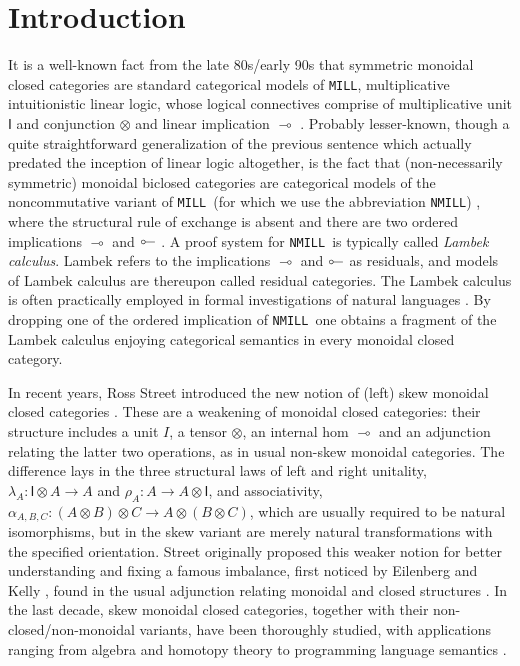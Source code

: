 \documentclass[submission,copyright,creativecommons]{eptcs}
\theoremstyle{definition}
\newcommand{\ot}{\otimes}
\newcommand{\lolli}{\multimap}
\newcommand{\illol}{\rotatebox[origin=c]{180}{$\multimap$}}
\newcommand{\I}{\mathsf{I}}
\newcommand{\MILL}{\texttt{MILL}}
\newcommand{\NMILL}{\texttt{NMILL}}
\begin{document}
\section{Introduction}
It is a well-known fact from the late 80s/early 90s that symmetric monoidal closed categories are standard categorical models of \MILL, multiplicative intuitionistic linear logic, whose logical connectives comprise of multiplicative unit $\I$ and conjunction $\ot$ and linear implication $\lolli$ \cite{mellies:categorical:09}. Probably lesser-known, though a quite straightforward generalization of the previous sentence which actually predated the inception of linear logic altogether, is the fact that (non-necessarily symmetric) monoidal biclosed categories are categorical models of the noncommutative variant of \MILL\ (for which we use the abbreviation \NMILL) \cite{abrusci:noncommutative:1990}, where the structural rule of exchange is absent and there are two ordered implications $\lolli$ and $\illol$ \cite{lambek:deductive:68}. A proof system for \NMILL\ is typically called \emph{Lambek calculus}. Lambek refers to the implications $\lolli$ and $\illol$ as residuals, and models of Lambek calculus are thereupon called residual categories. The Lambek calculus is often practically employed in formal investigations of natural languages \cite{lambek:mathematics:58}.
By dropping one of the ordered implication of \NMILL\ one obtains a fragment of the Lambek calculus enjoying categorical semantics in every monoidal closed category.

In recent years, Ross Street introduced the new notion of (left) skew monoidal closed categories \cite{street:skew-closed:2013}. These are a weakening of monoidal closed categories: their structure includes a unit $I$, a tensor $\ot$, an internal hom $\lolli$ and an adjunction relating the latter two operations, as in usual non-skew monoidal categories. The difference lays in the three structural laws of left and right unitality, $\lambda_A : \I \ot A \to A$ and $\rho_A : A \to A \ot \I$, and associativity, $\alpha_{A,B,C} : (A \ot B) \ot C \to A \ot (B \ot C)$, which are usually required to be natural isomorphisms, but in the skew variant are merely natural transformations with the specified orientation. Street originally proposed this weaker notion for better understanding and fixing a famous imbalance, first noticed by Eilenberg and Kelly \cite{eilenberg:closed:1966}, found in the usual adjunction relating monoidal and closed structures \cite{street:skew-closed:2013,uustalu:eilenberg-kelly:2020}. In the last decade, skew monoidal closed categories, together with their non-closed/non-monoidal variants, have been thoroughly studied, with applications ranging from algebra and homotopy theory to programming language semantics \cite{szlachanyi:skew-monoidal:2012,lack:skew:2012,lack:triangulations:2014,altenkirch:monads:2014,buckley:catalan:2015,bourke:skew:2017,bourke:skew:2018,tomita:realizability:21}.
\end{document}
